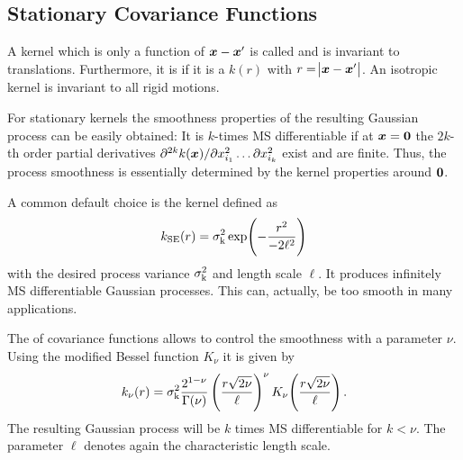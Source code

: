 
\subsection{Stationary Covariance Functions}
A kernel which is only a function of $\bm{x} - \bm{x}'$ is called 
 and is invariant to translations. Furthermore, it is 
 if it is a  $k(r)$ with 
    $r = \abs{\bm{x} - \bm{x}'}$.  An isotropic kernel is invariant to all rigid 
    motions.

For stationary kernels the smoothness properties of the resulting Gaussian 
process can be easily obtained: It is $k$-times MS differentiable if at $\bm{x} = \bm{0}$ the $2k$-th order partial derivatives $\partial^{2k} k(\bm{x}) 
/ \partial x_{i_1}^2 \dots \partial x_{i_k}^2$ exist and are finite. Thus, the 
process smoothness is essentially determined by the kernel properties around 
$\bm{0}$.

A common default choice is the  kernel 
    defined as
\begin{equation}
    k\ped{SE}(r) = \sigma\ped{k}^2 \exp\!\del{-\frac{r^2}{-2\ell^2}}
\end{equation}
with the desired process variance $\sigma_{\mathrm{k}}^2$ and length scale $\ell$. It 
produces infinitely MS differentiable Gaussian processes. This can, actually, be 
too smooth in many applications.

The  of covariance functions allows to control the 
smoothness with a parameter $\nu$. Using the modified Bessel function $K_{\nu}$ 
it is given by
\begin{equation}
    k_{\nu}(r) = \sigma\ped{k}^2 \frac{2^{1-\nu}}{\Gamma(\nu)} 
    \del{\frac{r\sqrt{2\nu}}{\ell}}^{\nu} 
    K_{\nu}\!\del{\frac{r\sqrt{2\nu}}{\ell}} \text{.}
\end{equation}
The resulting Gaussian process will be $k$ times MS differentiable for $k 
< \nu$. The parameter $\ell$ denotes again the characteristic length scale.

